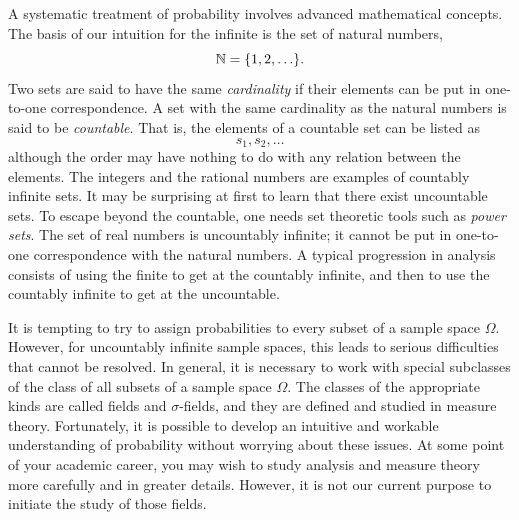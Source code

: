 A systematic treatment of probability involves advanced mathematical concepts.
The basis of our intuition for the infinite is the set of natural numbers,
\begin{equation*}
\mathbb{N} = \{ 1, 2, \ldots \}.
\end{equation*}
Two sets are said to have the same \emph{cardinality} if their elements can be put in one-to-one correspondence.
A set with the same cardinality as the natural numbers is said to be \emph{countable}.
That is, the elements of a countable set can be listed as
\begin{equation*}
s_1, s_2, \ldots
\end{equation*}
although the order may have nothing to do with any relation between the elements.
The integers and the rational numbers are examples of countably infinite sets.
It may be surprising at first to learn that there exist uncountable sets.
To escape beyond the countable, one needs set theoretic tools such as \emph{power sets}.
The set of real numbers is uncountably infinite; it cannot be put in one-to-one correspondence with the natural numbers.
A typical progression in analysis consists of using the finite to get at the countably infinite, and then to use the countably infinite to get at the uncountable.

It is tempting to try to assign probabilities to every subset of a sample space $\Omega$.
However, for uncountably infinite sample spaces, this leads to serious difficulties that cannot be resolved.
In general, it is necessary to work with special subclasses of the class of all subsets of a sample space $\Omega$.
The classes of the appropriate kinds are called fields and $\sigma$-fields, and they are defined and studied in measure theory.
Fortunately, it is possible to develop an intuitive and workable understanding of probability without worrying about these issues.
At some point of your academic career, you may wish to study analysis and measure theory more carefully and in greater details.
However, it is not our current purpose to initiate the study of those fields.
